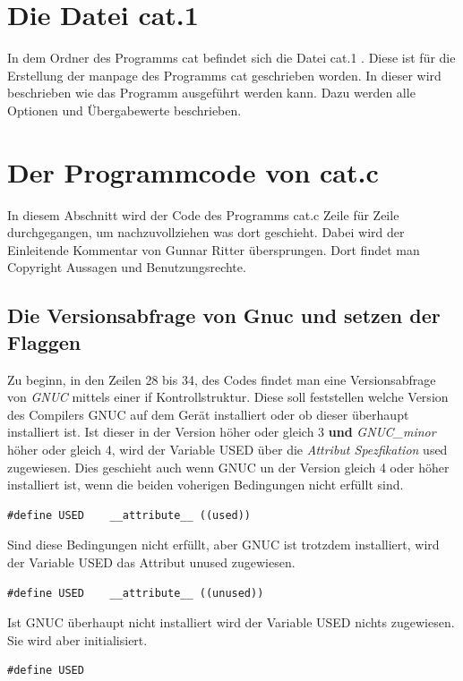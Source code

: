 {\section{Die Datei cat.1}
In dem Ordner des Programms cat befindet sich die Datei cat.1 .
Diese ist für die Erstellung der manpage des Programms cat geschrieben worden.
In dieser wird beschrieben wie das Programm ausgeführt werden kann.
Dazu werden alle Optionen und Übergabewerte beschrieben.\par


\section{Der Programmcode von cat.c}
In diesem Abschnitt wird der Code des Programms cat.c Zeile für Zeile durchgegangen, um nachzuvollziehen was dort geschieht. 
Dabei wird der Einleitende Kommentar von Gunnar Ritter übersprungen. Dort findet man Copyright Aussagen und Benutzungsrechte.

\subsection{Die Versionsabfrage von Gnuc und setzen der Flaggen}
Zu beginn, in den Zeilen 28 bis 34, des Codes findet man eine Versionsabfrage von \textit{GNUC} mittels einer if Kontrollstruktur.
Diese soll feststellen welche Version des Compilers GNUC auf dem Gerät installiert oder ob dieser überhaupt installiert ist.
Ist dieser in der Version höher oder gleich 3 \textbf{und} \textit{GNUC\_minor} höher oder gleich 4, wird der Variable USED über die \textit{Attribut Spezfikation} used zugewiesen.
Dies geschieht auch wenn GNUC un der Version gleich 4 oder höher installiert ist, wenn die beiden voherigen Bedingungen nicht erfüllt sind.

\begin{lstlisting}
#define USED	__attribute__ ((used))
\end{lstlisting}

Sind diese Bedingungen nicht erfüllt, aber GNUC ist trotzdem installiert, wird der Variable USED das Attribut unused zugewiesen.

\begin{lstlisting}
#define USED	__attribute__ ((unused))
\end{lstlisting}

Ist GNUC überhaupt nicht installiert wird der Variable USED nichts zugewiesen. Sie wird aber initialisiert.

\begin{lstlisting}
#define USED
\end{lstlisting}

}

